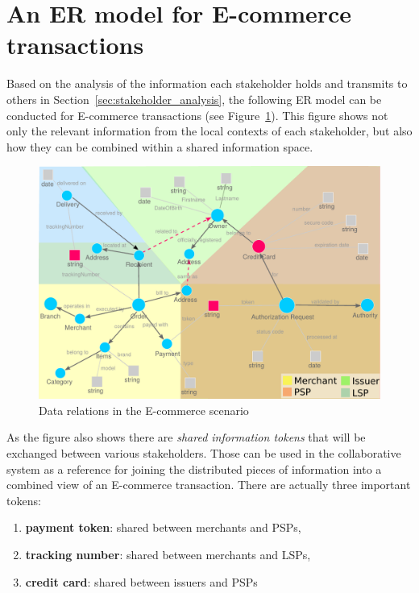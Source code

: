 
\section{An \gls{ER} model for \gls{E-commerce} transactions}
\label{sec:data_model_transactions}

Based on the analysis of the information each stakeholder holds and transmits to others in Section~\ref{sec:stakeholder_analysis}, the following \gls{ER} model can be conducted for \gls{E-commerce} transactions (see Figure~\ref{fig:images_data_model}). This figure shows not only the relevant information from the local contexts of each stakeholder, but also how they can be combined within a shared information space. \\

\begin{figure}[!ht]
  \centering
  \includegraphics[width=0.9\columnwidth]{images/ontology_scenario_1.pdf}
  \caption[Data relations in the E-commerce scenario]{Data relations in the \gls{E-commerce} scenario}
\label{fig:images_data_model}
\end{figure}

As the figure also shows there are \emph{shared information tokens} that will be exchanged between various stakeholders. Those can be used in the collaborative system as a reference for joining the distributed pieces of information into a combined view of an \gls{E-commerce} transaction. There are actually three important tokens: \@

\begin{enumerate}
  \item \textbf{payment token}: shared between merchants and \gls{PSP}s,
  \item \textbf{tracking number}: shared between merchants and \gls{LSP}s,
  \item \textbf{credit card}: shared between issuers and \gls{PSP}s
\end{enumerate}


